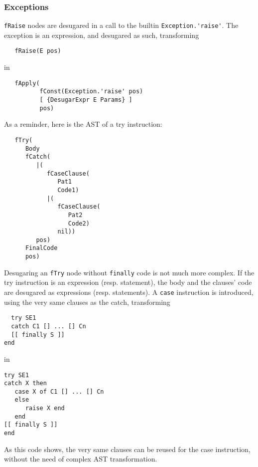 \documentclass[a4paper]{memoir}
\begin{document}
\subsubsection{Exceptions}\label{sec:arch:desugar:exceptions}
\lstinline!fRaise! nodes are desugared in a call to the builtin
\lstinline!Exception.'raise'!. The exception is an expression, and desugared as
such, transforming
\begin{lstlisting}
   fRaise(E pos)
\end{lstlisting}
in
\begin{lstlisting}
   fApply(
          fConst(Exception.'raise' pos) 
          [ {DesugarExpr E Params} ] 
          pos)
\end{lstlisting}
\pagebreak[4]
As a reminder, here is the AST of a try instruction:
\nopagebreak[4]
\begin{lstlisting}
   fTry(
      Body
      fCatch(
         |(
            fCaseClause(
               Pat1
               Code1)
            |(
               fCaseClause(
                  Pat2
                  Code2)
               nil))
         pos)
      FinalCode
      pos)
\end{lstlisting}
Desugaring an \lstinline!fTry! node without \lstinline!finally! code is not much
more complex.  If the try instruction is an expression (resp. statement), the
body and the clauses' code are desugared as expressions (resp. statements).
A \lstinline!case! instruction is introduced, using the very same clauses as the
catch, transforming \cite{BaseLang}
\begin{lstlisting}
  try SE1 
  catch C1 [] ... [] Cn 
  [[ finally S ]]
end
\end{lstlisting}

in

\begin{lstlisting}
try SE1 
catch X then 
   case X of C1 [] ... [] Cn 
   else 
      raise X end 
   end 
[[ finally S ]]
end
\end{lstlisting}

As this code shows, the very same clauses can be reused for the case
instruction, without the need of complex AST transformation.
\end{document}

